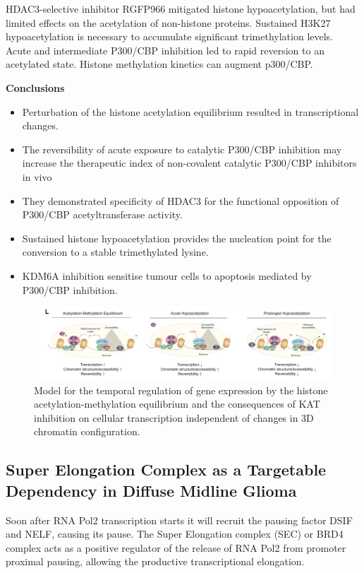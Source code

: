 HDAC3-selective inhibitor RGFP966 mitigated histone hypoacetylation, but had limited effects on the acetylation of non-histone proteins.
Sustained H3K27 hypoacetylation is necessary to accumulate significant trimethylation levels. Acute and intermediate P300/CBP inhibition led to rapid reversion to an acetylated state. Histone methylation kinetics can augment p300/CBP.

\textbf{Conclusions}
\begin{itemize}
\item Perturbation of the histone acetylation equilibrium resulted in transcriptional changes.
\item The reversibility of acute exposure to catalytic P300/CBP inhibition may increase the therapeutic index of non-covalent catalytic P300/CBP inhibitors in vivo
\item They demonstrated specificity of HDAC3 for the functional opposition of P300/CBP acetyltransferase activity.
\item Sustained histone hypoacetylation provides the nucleation point for the conversion to a stable trimethylated lysine.
\item KDM6A inhibition sensitise tumour cells to apoptosis mediated by P300/CBP inhibition.
\end{itemize}

\begin{figure}
\centering
\includegraphics[width=\textwidth]{../_resources/Screen_Shot_2022-12-20_at_12-01-08.png}
\caption{Model for the temporal regulation of gene expression by the histone acetylation-methylation equilibrium and the consequences of KAT inhibition on cellular transcription independent of changes in 3D chromatin configuration.}
\end{figure}

\subsection{Super Elongation Complex as a Targetable Dependency in Diffuse Midline Glioma}
Soon after RNA Pol2 transcription starts it will recruit the
pausing factor DSIF and NELF, causing its pause.
The Super Elongation complex (SEC) or BRD4 complex acts as
a positive regulator of the release of RNA Pol2 from
promoter proximal pausing, allowing the productive
transcriptional elongation.

